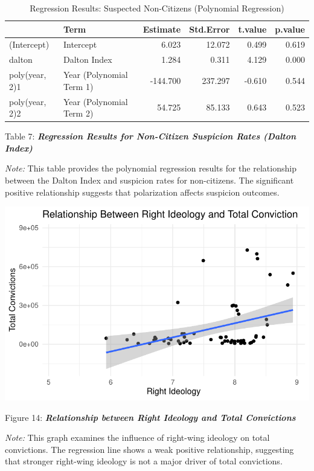 \documentclass[
]{article}
\begin{document}
\begin{table}
\centering
\caption{Regression Results: Suspected Non-Citizens (Polynomial Regression)}
\centering
\begin{tabular}[t]{l|l|r|r|r|r}
\hline
  & Term & Estimate & Std.Error & t.value & p.value\\
\hline
(Intercept) & Intercept & 6.023 & 12.072 & 0.499 & 0.619\\
\hline
dalton & Dalton Index & 1.284 & 0.311 & 4.129 & 0.000\\
\hline
poly(year, 2)1 & Year (Polynomial Term 1) & -144.700 & 237.297 & -0.610 & 0.544\\
\hline
poly(year, 2)2 & Year (Polynomial Term 2) & 54.725 & 85.133 & 0.643 & 0.523\\
\hline
\end{tabular}
\end{table}

Table 7: \textbf{\emph{Regression Results for Non-Citizen Suspicion
Rates (Dalton Index)}}

\emph{Note:} This table provides the polynomial regression results for
the relationship between the Dalton Index and suspicion rates for
non-citizens. The significant positive relationship suggests that
polarization affects suspicion outcomes.

\includegraphics{DataMan_Project_files/figure-pdf/unnamed-chunk-46-1.pdf}

Figure 14: \textbf{\emph{Relationship between Right Ideology and Total
Convictions}}

\emph{Note:} This graph examines the influence of right-wing ideology on
total convictions. The regression line shows a weak positive
relationship, suggesting that stronger right-wing ideology is not a
major driver of total convictions.
\end{document}
